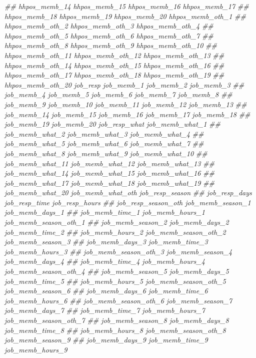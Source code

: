\documentclass[
]{article}
\newenvironment{Shaded}{\begin{snugshade}}{\end{snugshade}}
\newcommand{\CommentTok}[1]{\textcolor[rgb]{0.56,0.35,0.01}{\textit{#1}}}
\begin{document}
\begin{Shaded}
\begin{Highlighting}[]
\CommentTok{##      hhpos_memb_14 hhpos_memb_15 hhpos_memb_16 hhpos_memb_17}
\CommentTok{##      hhpos_memb_18 hhpos_memb_19 hhpos_memb_20 hhpos_memb_oth_1}
\CommentTok{##      hhpos_memb_oth_2 hhpos_memb_oth_3 hhpos_memb_oth_4}
\CommentTok{##      hhpos_memb_oth_5 hhpos_memb_oth_6 hhpos_memb_oth_7}
\CommentTok{##      hhpos_memb_oth_8 hhpos_memb_oth_9 hhpos_memb_oth_10}
\CommentTok{##      hhpos_memb_oth_11 hhpos_memb_oth_12 hhpos_memb_oth_13}
\CommentTok{##      hhpos_memb_oth_14 hhpos_memb_oth_15 hhpos_memb_oth_16}
\CommentTok{##      hhpos_memb_oth_17 hhpos_memb_oth_18 hhpos_memb_oth_19}
\CommentTok{##      hhpos_memb_oth_20 job_resp job_memb_1 job_memb_2 job_memb_3}
\CommentTok{##      job_memb_4 job_memb_5 job_memb_6 job_memb_7 job_memb_8}
\CommentTok{##      job_memb_9 job_memb_10 job_memb_11 job_memb_12 job_memb_13}
\CommentTok{##      job_memb_14 job_memb_15 job_memb_16 job_memb_17 job_memb_18}
\CommentTok{##      job_memb_19 job_memb_20 job_resp_what job_memb_what_1}
\CommentTok{##      job_memb_what_2 job_memb_what_3 job_memb_what_4}
\CommentTok{##      job_memb_what_5 job_memb_what_6 job_memb_what_7}
\CommentTok{##      job_memb_what_8 job_memb_what_9 job_memb_what_10}
\CommentTok{##      job_memb_what_11 job_memb_what_12 job_memb_what_13}
\CommentTok{##      job_memb_what_14 job_memb_what_15 job_memb_what_16}
\CommentTok{##      job_memb_what_17 job_memb_what_18 job_memb_what_19}
\CommentTok{##      job_memb_what_20 job_memb_what_oth job_resp_season}
\CommentTok{##      job_resp_days job_resp_time job_resp_hours}
\CommentTok{##      job_resp_season_oth job_memb_season_1 job_memb_days_1}
\CommentTok{##      job_memb_time_1 job_memb_hours_1 job_memb_season_oth_1}
\CommentTok{##      job_memb_season_2 job_memb_days_2 job_memb_time_2}
\CommentTok{##      job_memb_hours_2 job_memb_season_oth_2 job_memb_season_3}
\CommentTok{##      job_memb_days_3 job_memb_time_3 job_memb_hours_3}
\CommentTok{##      job_memb_season_oth_3 job_memb_season_4 job_memb_days_4}
\CommentTok{##      job_memb_time_4 job_memb_hours_4 job_memb_season_oth_4}
\CommentTok{##      job_memb_season_5 job_memb_days_5 job_memb_time_5}
\CommentTok{##      job_memb_hours_5 job_memb_season_oth_5 job_memb_season_6}
\CommentTok{##      job_memb_days_6 job_memb_time_6 job_memb_hours_6}
\CommentTok{##      job_memb_season_oth_6 job_memb_season_7 job_memb_days_7}
\CommentTok{##      job_memb_time_7 job_memb_hours_7 job_memb_season_oth_7}
\CommentTok{##      job_memb_season_8 job_memb_days_8 job_memb_time_8}
\CommentTok{##      job_memb_hours_8 job_memb_season_oth_8 job_memb_season_9}
\CommentTok{##      job_memb_days_9 job_memb_time_9 job_memb_hours_9}

\end{Highlighting}
\end{Shaded}
\end{document}
